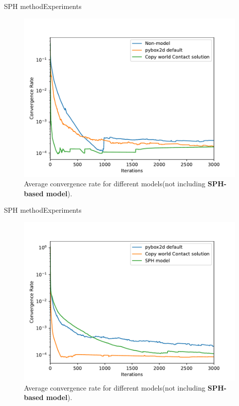 \documentclass{beamer}
\begin{document}
\begin{frame}{SPH method}{Experiments}
\begin{figure}[!h]
        \centering
        \includegraphics[scale = 0.4]{../report/Figures/nosph}
        \caption{Average convergence rate for different models(not including \textbf{SPH-based model}).}
        \label{fg:nosph}
\end{figure}
\end{frame}
\begin{frame}{SPH method}{Experiments}
\begin{figure}[!h]
        \centering
        \includegraphics[scale = 0.4]{../report/Figures/addsph}
        \caption{Average convergence rate for different models(not including \textbf{SPH-based model}).}
        \label{fg:nosph}
\end{figure}
\end{frame}
\end{document}
